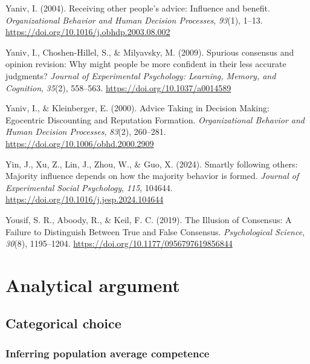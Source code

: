 \documentclass[
  doc,floatsintext]{apa6}
\newlength{\cslhangindent}
\newenvironment{CSLReferences}[2] %
 {\begin{list}{}{%
  \setlength{\itemindent}{0pt}
  \setlength{\leftmargin}{0pt}
  \setlength{\parsep}{0pt}
  \ifodd #1
   \setlength{\leftmargin}{\cslhangindent}
   \setlength{\itemindent}{-1\cslhangindent}
  \fi
  \setlength{\itemsep}{#2\baselineskip}}}
 {\end{list}}
\begin{document}
\begin{CSLReferences}{1}{0}
Yaniv, I. (2004). Receiving other people{'}s advice: Influence and benefit. \emph{Organizational Behavior and Human Decision Processes}, \emph{93}(1), 1--13. \url{https://doi.org/10.1016/j.obhdp.2003.08.002}

Yaniv, I., Choshen-Hillel, S., \& Milyavsky, M. (2009). Spurious consensus and opinion revision: Why might people be more confident in their less accurate judgments? \emph{Journal of Experimental Psychology: Learning, Memory, and Cognition}, \emph{35}(2), 558--563. \url{https://doi.org/10.1037/a0014589}

Yaniv, I., \& Kleinberger, E. (2000). Advice Taking in Decision Making: Egocentric Discounting and Reputation Formation. \emph{Organizational Behavior and Human Decision Processes}, \emph{83}(2), 260--281. \url{https://doi.org/10.1006/obhd.2000.2909}

Yin, J., Xu, Z., Lin, J., Zhou, W., \& Guo, X. (2024). Smartly following others: Majority influence depends on how the majority behavior is formed. \emph{Journal of Experimental Social Psychology}, \emph{115}, 104644. \url{https://doi.org/10.1016/j.jesp.2024.104644}

Yousif, S. R., Aboody, R., \& Keil, F. C. (2019). The Illusion of Consensus: A Failure to Distinguish Between True and False Consensus. \emph{Psychological Science}, \emph{30}(8), 1195--1204. \url{https://doi.org/10.1177/0956797619856844}

\end{CSLReferences}

\newpage

\appendix


\section{Analytical argument}\label{analytical}

\subsection{Categorical choice}\label{categorical-choice}

\subsubsection{Inferring population average competence}\label{inferring-population-average-competence}
\end{document}
